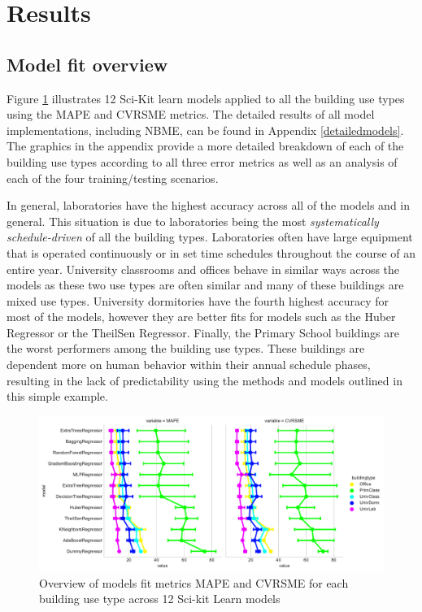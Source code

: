 \documentclass[preprint,12pt]{elsarticle}
\begin{document}
\section{Results}
\label{sec:results}

\subsection{Model fit overview}
\label{sec:accuracy}

Figure \ref{fig:model_fit} illustrates 12 Sci-Kit learn models applied to all the building use types using the MAPE and CVRSME metrics. The detailed results of all model implementations, including NBME, can be found in Appendix \ref{detailedmodels}. The graphics in the appendix provide a more detailed breakdown of each of the building use types according to all three error metrics as well as an analysis of each of the four training/testing scenarios. 

In general, laboratories have the highest accuracy across all of the models and in general. This situation is due to laboratories being the most \emph{systematically schedule-driven} of all the building types. Laboratories often have large equipment that is operated continuously or in set time schedules throughout the course of an entire year. University classrooms and offices behave in similar ways across the models as these two use types are often similar and many of these buildings are mixed use types. University dormitories have the fourth highest accuracy for most of the models, however they are better fits for models such as the Huber Regressor or the TheilSen Regressor. Finally, the Primary School buildings are the worst performers among the building use types. These buildings are dependent more on human behavior within their annual schedule phases, resulting in the lack of predictability using the methods and models outlined in this simple example.

\begin{figure}[ht!]
\begin{center}
\includegraphics[width=1\columnwidth]{figures/Cat_Plot.pdf}
\caption{Overview of models fit metrics MAPE and CVRSME for each building use type across 12 Sci-kit Learn models}
\label{fig:model_fit}%
\end{center}
\end{figure}
\end{document}
